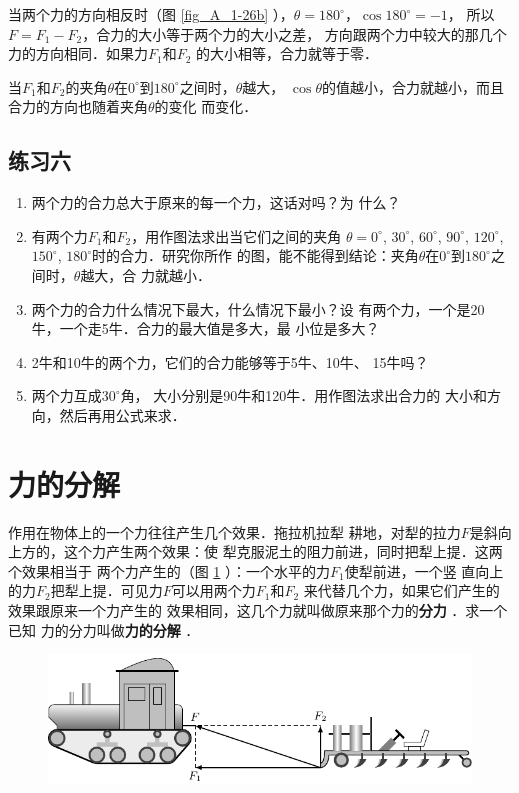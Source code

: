    当两个力的方向相反时（图 \ref{fig_A_1-26b} ），$\theta =180^\circ$，$\cos 180^\circ=-1$，
所以$F=F_1-F_2$，合力的大小等于两个力的大小之差，
方向跟两个力中较大的那几个力的方向相同．如果力$F_1$和$F_2$
的大小相等，合力就等于零．

    当$F_1$和$F_2$的夹角$\theta$在$0^\circ$到$180^\circ$之间时，$\theta$越大，
$\cos\theta$的值越小，合力就越小，而且合力的方向也随着夹角$\theta$的变化
而变化．


\subsection*{练习六} 
\begin{enumerate} 
\item 两个力的合力总大于原来的每一个力，这话对吗？为
什么？

\item 有两个力$F_1$和$F_2$，用作图法求出当它们之间的夹角
$\theta =0^\circ$, $30^\circ$, $60^\circ$, $90^\circ$, $120^\circ$, $150^\circ$, $180^\circ$时的合力．研究你所作
的图，能不能得到结论：夹角$\theta$在$0^\circ$到$180^\circ$之间时，$\theta $越大，合
力就越小．
\item 两个力的合力什么情况下最大，什么情况下最小？设
有两个力，一个是20牛，一个走5牛．合力的最大值是多大，最
小位是多大？
\item 2牛和10牛的两个力，它们的合力能够等于5牛、10牛、
15牛吗？
\item   两个力互成$30^\circ$角， 大小分别是90牛和120牛．用作图法求出合力的
大小和方向，然后再用公式来求．
\end{enumerate} 
    
\section{力的分解} 
作用在物体上的一个力往往产生几个效果．拖拉机拉犁
耕地，对犁的拉力$F$是斜向上方的，这个力产生两个效果：使
犁克服泥土的阻力前进，同时把犁上提．这两个效果相当于
两个力产生的（图 \ref{fig_A_1-27} ）：一个水平的力$F_1$使犁前进，一个竖
直向上的力$F_2$把犁上提．可见力$F$可以用两个力$F_1$和$F_2$
来代替几个力，如果它们产生的效果跟原来一个力产生的
效果相同，这几个力就叫做原来那个力的\textbf{分力} ．求一个已知
力的分力叫做\textbf{力的分解} ．

\begin{figure} [htp]\centering
\includegraphics{fig/A/1-27.pdf} 
\caption{} \label{fig_A_1-27} 
\end{figure} 

